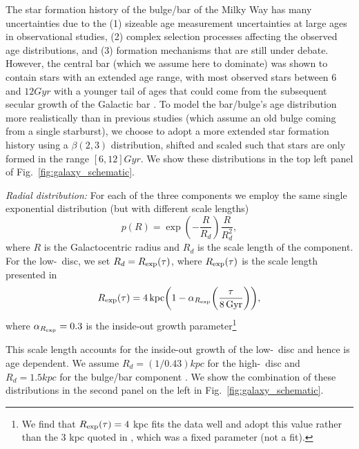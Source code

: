 The star formation history of the bulge/bar of the Milky Way has many uncertainties due to the (1) sizeable age measurement uncertainties at large ages in observational studies, (2) complex selection processes affecting the observed age distributions, and (3) formation mechanisms that are still under debate. However, the central bar (which we assume here to dominate) was shown to contain stars with an extended age range, with most observed stars between $6$ and $12 \unit{Gyr}$ with a younger tail of ages that could come from the subsequent secular growth of the Galactic bar \citep[e.g.,][]{Bovy+2019}. To model the bar/bulge's age distribution more realistically than in previous studies (which assume an old bulge coming from a single starburst), we choose to adopt a more extended star formation history using a $\beta(2,3)$ distribution, shifted and scaled such that stars are only formed in the range $[6, 12] \unit{Gyr}$. We show these distributions in the top left panel of Fig.~\ref{fig:galaxy_schematic}.

\textit{Radial distribution:} For each of the three components we employ the same single exponential distribution (but with different scale lengths)
\begin{equation}\label{eq:galaxy_R}
    p(R) = \exp(-\frac{R}{R_d}) \frac{R}{R_d^2},
\end{equation}
where $R$ is the Galactocentric radius and $R_d$ is the scale length of the component. For the low-\achem~disc, we set $R_d = R_{\rm exp}(\tau)$, where $R_{\rm exp}(\tau)$ is the scale length presented in \citet[][Eq.~6]{Frankel+2018}
\begin{equation}
    R_{\rm exp}(\tau) = 4 \unit{kpc} \qty(1 - \alpha_{R_{\rm exp}} \qty(\frac{\tau}{8 \unit{Gyr}})),
\end{equation}
where $\alpha_{R_{\rm exp}} = 0.3$ is the inside-out growth parameter\footnote{We find that $R_{\rm exp}(\tau) = 4$ kpc fits the data well and adopt this value rather than the 3 kpc quoted in \cite{Frankel+2018}, which was a fixed parameter (not a fit).}

This scale length accounts for the inside-out growth of the low-\achem~disc and hence is age dependent. We assume $R_d = (1 / 0.43) \unit{kpc}$ for the high-\achem~disc \citep[][Table~1]{Bovy+2016} and $R_d = 1.5 \unit{kpc}$ for the bulge/bar component \citep{Bovy+2019}.  We show the combination of these distributions in the second panel on the left in Fig.~\ref{fig:galaxy_schematic}.

